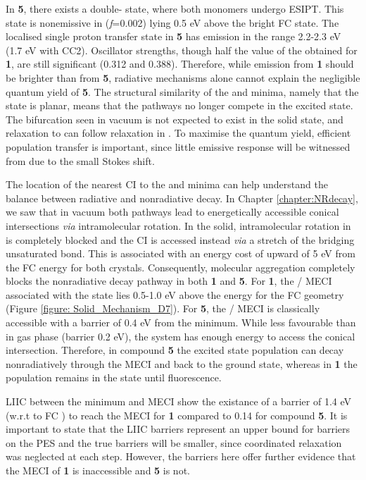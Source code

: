 In \textbf{5}, there  exists a double-\Kstar{} state, where both monomers undergo ESIPT. This state is nonemissive in \sone{} (\textit{f}=0.002) lying 0.5 eV above the bright FC state. The localised single proton transfer state in \textbf{5} has emission in the range 2.2-2.3 eV (1.7 eV with CC2). Oscillator strengths, though half the value of the obtained for \textbf{1}, are still significant (0.312 and 0.388). Therefore, while emission from \textbf{1} should be brighter than from \textbf{5}, radiative mechanisms alone cannot explain the negligible quantum yield of \textbf{5}. The structural similarity of the \Estar{} and \Kstar{} minima, namely that the \Estar{} state is planar, means that the pathways no longer compete in the excited state. The bifurcation seen in vacuum is not expected to exist in the solid state, and relaxation to \Kstar{} can follow relaxation in \Estar{}. To maximise the quantum yield, efficient population transfer \Kstar{} is important, since little emissive response will be witnessed from \Estar{} due to the small Stokes shift.

The location of the nearest CI to the \Estar{} and \Kstar{} minima can help understand the balance between radiative and nonradiative decay. In Chapter \ref{chapter:NRdecay}, we saw that in vacuum both pathways lead to energetically accessible conical intersections \textit{via} intramolecular rotation. In the solid, intramolecular rotation in \Estar{} is completely blocked and the \Estar{} CI is accessed instead \textit{via} a stretch of the bridging unsaturated bond. This is associated with an energy cost of upward of 5 eV from the FC \sone{} energy for both crystals. Consequently, molecular aggregation completely blocks the \Estar{} nonradiative decay pathway in both \textbf{1} and \textbf{5}. For \textbf{1}, the \sone/\szero{} MECI associated with the \Kstar{} state lies 0.5-1.0 eV above the \sone{} energy for the FC geometry (Figure \ref{figure: Solid_Mechanism_D7}). For \textbf{5}, the \sone/\szero{} MECI is classically accessible with a barrier of 0.4 eV from the \Kstar{} minimum. While less favourable than in gas phase (barrier 0.2 eV), the system has enough energy to access the conical intersection. Therefore, in compound \textbf{5} the excited state population can decay nonradiatively through the MECI and back to the ground state, whereas in \textbf{1} the population remains in the \Kstar{} state until fluorescence.

\ac{LIIC} between the \Kstar{} minimum and MECI  show the existance of a barrier of 1.4 eV (w.r.t to FC \sone{}) to reach the MECI for \textbf{1} compared to 0.14 for compound \textbf{5}. It is important to state that the LIIC barriers represent an upper bound for barriers on the PES and the true barriers will be smaller, since coordinated relaxation was neglected at each step. However, the barriers here offer further evidence that the MECI of \textbf{1} is inaccessible and \textbf{5} is not. 

